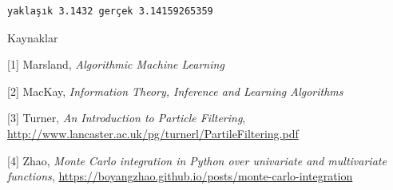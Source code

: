 \documentclass[12pt,fleqn]{article}\usepackage{../../common}
\begin{document}
\begin{verbatim}
yaklaşık 3.1432 gerçek 3.14159265359
\end{verbatim}

Kaynaklar

[1] Marsland, {\em Algorithmic Machine Learning}

[2] MacKay, {\em Information Theory, Inference and Learning Algorithms}

[3] Turner, {\em An Introduction to Particle Filtering}, \url{http://www.lancaster.ac.uk/pg/turnerl/PartileFiltering.pdf}

[4] Zhao, {\em Monte Carlo integration in Python over univariate and multivariate functions},
    \url{https://boyangzhao.github.io/posts/monte-carlo-integration}
\end{document}

